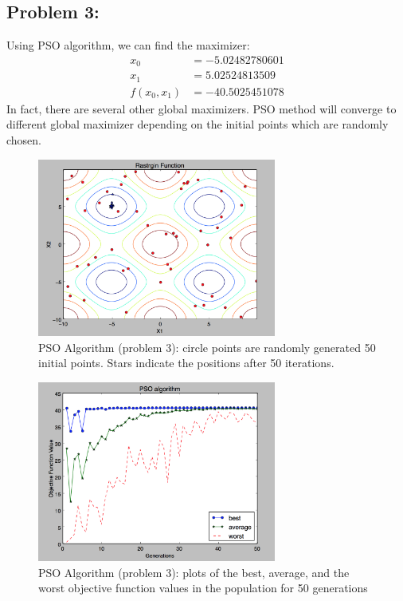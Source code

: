 \documentclass{article}
\begin{document}
\subsection*{{Problem 3: }}

Using PSO algorithm, we can find the maximizer: \\
\begin{align*}
x_0 & =  -5.02482780601\\
x_1 & =  5.02524813509\\
f(x_0,x_1) & = -40.5025451078 
\end{align*}
In fact, there are several other global maximizers. PSO method will converge to different global maximizer depending on the initial points which are randomly chosen.   
\begin{figure}[h]
\includegraphics[width=0.7\textwidth]{PSO_max} 
\centering
\caption{PSO Algorithm (problem 3): circle points are randomly generated 50 initial points. Stars indicate the positions after 50 iterations. }

\end{figure}

\begin{figure}[h]
\includegraphics[width=0.7\textwidth]{PSO_max_best} 
\centering
\caption{PSO Algorithm (problem 3): plots of the best, average, and the worst objective function values in the population for 50 generations }

\end{figure}
\end{document}
